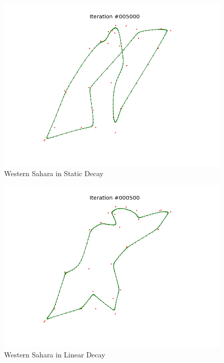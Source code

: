 \documentclass[11pt]{article}
\begin{document}
\begin{figure}[!ht]
  \centering
  \includegraphics[scale=0.6]{w_s.png}
  \caption{Western Sahara in Static Decay}
\end{figure}

\begin{figure}[!ht]
  \centering
  \includegraphics[scale=0.6]{w_l.png}
  \caption{Western Sahara in Linear Decay}
\end{figure}
\end{document}
